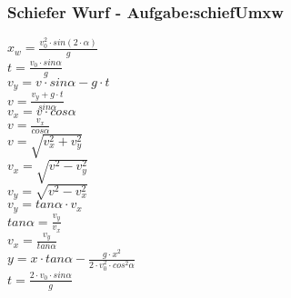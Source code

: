 \subsubsection{Schiefer Wurf  - Aufgabe:schiefUmxw} 
\begin{minipage}{0.45\textwidth} 
$ x_{w}  = \frac{v_{0} ^{2} \cdot sin(2\cdot \alpha )}{       g} $\\ 
$ t =\frac{v_{0} \cdot sin \alpha }{  g} $\\ 
$ v_{y}  =  v\cdot sin\alpha - g\cdot t $\\ 
$ v= \frac{ v_{y} +g\cdot t}{ sin\alpha } $\\ 
$ v_{x}  = v\cdot  cos\alpha $\\ 
$ v= \frac{ v_{x} }{ cos\alpha } $\\ 
$ v= \sqrt{ v_{x} ^{2} + v_{y} ^{2} } $\\ 
$ v_{x} = \sqrt{ v^{2}  - v_{y} ^{2} } $\\ 
$ v_{y} = \sqrt{ v^{2}  - v_{x} ^{2} } $\\ 
$ v_{y} = tan \alpha \cdot  v_{x} $\\ 
$ tan \alpha = \frac{v_{y} }{v_{x} } $\\ 
$ v_{x} = \frac{v_{y} }{tan \alpha } $\\ 
$ y = x\cdot tan \alpha  - \frac{   g\cdot x^{2} }{2\cdot v^{2} _{0} \cdot cos ^{2}\alpha } $\\ 
$ t =\frac{2\cdot v_{0} \cdot sin \alpha }{ g} $\\ 
\end{minipage} 
\begin{minipage}{0.45\textwidth} 
 
\end{minipage} 
